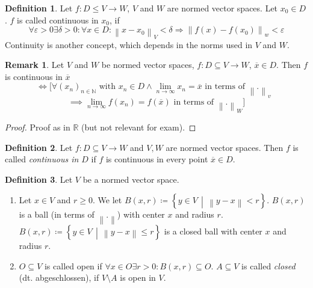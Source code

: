 \documentclass[a4paper,landscape,twocolumn]{article}
\theoremstyle{definition}
\newtheorem{defi}{Definition}
\newtheorem{rem}{Remark}
\newcommand\setdef[2]{\left\{#1\,\middle|\,#2\right\}}
\newcommand\norm[1]{\left\|#1\right\|}
\begin{document}
\begin{defi}
  Let $f: D \leq V \to W$, $V$ and $W$ are normed vector spaces.
  Let $x_0 \in D$. $f$ is called continuous in $x_0$, if
  \[ \forall \varepsilon > 0 \exists \delta > 0: \forall x \in D: \norm{x - x_0}_V < \delta \Rightarrow \norm{f(x) - f(x_0)}_w < \varepsilon \]
  Continuity is another concept, which depends in the norms used in $V$ and $W$.
\end{defi}

\begin{rem}
  Let $V$ and $W$ be normed vector spaces, $f: D \subseteq V \to W$,
  $\overline{x} \in D$. Then $f$ is continuous in $\overline{x}$
  \[ \Leftrightarrow [\forall (x_n)_{n \in \mathbb N} \text{ with } x_n \in D \land \lim_{n\to\infty} x_n = \overline{x} \text{ in terms of $\norm{.}_v$ } \]
  \[ \implies \lim_{n\to\infty} f(x_n) = f(\overline{x}) \text{ in terms of } \norm{.}_W] \]
\end{rem}
\begin{proof}
  Proof as in $\mathbb R$ (but not relevant for exam).
\end{proof}

\begin{defi}
  Let $f: D \subseteq V \to W$ and $V,W$ are normed vector spaces.
  Then $f$ is called \emph{continuous in $D$} if $f$ is continuous in every point $\overline{x} \in D$.
\end{defi}
\begin{defi}
  Let $V$ be a normed vector space.
  \begin{enumerate}
  \item Let $x \in V$ and $r \geq 0$. We let $B(x,r) \coloneqq \setdef{y \in V}{\norm{y - x} < r}$.
    $B(x,r)$ is a ball (in terms of $\norm{.}$) with center $x$ and radius $r$.
    $B(x,r) \coloneqq \setdef{y \in V}{\norm{y - x} \leq r}$ is a closed ball with center $x$ and radius $r$.
  \item
    $O \subseteq V$ is called open if $\forall x \in O \exists r > 0: B(x,r) \subseteq O$.
    $A \subseteq V$ is called \emph{closed} (dt. abgeschlossen), if $V \setminus A$ is open in $V$.
  \end{enumerate}
\end{defi}
\end{document}
